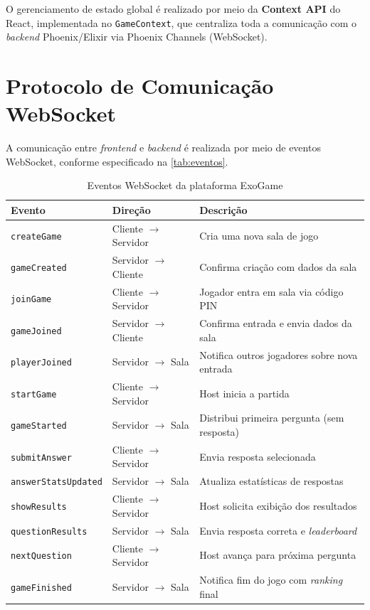 \documentclass[
	12pt,
	openany,
	oneside,
	a4paper,
	english,
	brazil
]{abntex2}
\begin{document}
O gerenciamento de estado global é realizado por meio da \textbf{Context API} do React, implementada no \texttt{GameContext}, que centraliza toda a comunicação com o \textit{backend} Phoenix/Elixir via Phoenix Channels (WebSocket).

\section{Protocolo de Comunicação WebSocket}

A comunicação entre \textit{frontend} e \textit{backend} é realizada por meio de eventos WebSocket, conforme especificado na \autoref{tab:eventos}.

\begin{table}[htb]
\caption{\label{tab:eventos}Eventos WebSocket da plataforma ExoGame}
\begin{tabular}{p{3.5cm}|p{2.5cm}|p{7.5cm}}
  \toprule
  \textbf{Evento} & \textbf{Direção} & \textbf{Descrição} \\
  \midrule
  \texttt{createGame} & Cliente $\rightarrow$ Servidor & Cria uma nova sala de jogo \\
  \midrule
  \texttt{gameCreated} & Servidor $\rightarrow$ Cliente & Confirma criação com dados da sala \\
  \midrule
  \texttt{joinGame} & Cliente $\rightarrow$ Servidor & Jogador entra em sala via código PIN \\
  \midrule
  \texttt{gameJoined} & Servidor $\rightarrow$ Cliente & Confirma entrada e envia dados da sala \\
  \midrule
  \texttt{playerJoined} & Servidor $\rightarrow$ Sala & Notifica outros jogadores sobre nova entrada \\
  \midrule
  \texttt{startGame} & Cliente $\rightarrow$ Servidor & Host inicia a partida \\
  \midrule
  \texttt{gameStarted} & Servidor $\rightarrow$ Sala & Distribui primeira pergunta (sem resposta) \\
  \midrule
  \texttt{submitAnswer} & Cliente $\rightarrow$ Servidor & Envia resposta selecionada \\
  \midrule
  \texttt{answerStatsUpdated} & Servidor $\rightarrow$ Sala & Atualiza estatísticas de respostas \\
  \midrule
  \texttt{showResults} & Cliente $\rightarrow$ Servidor & Host solicita exibição dos resultados \\
  \midrule
  \texttt{questionResults} & Servidor $\rightarrow$ Sala & Envia resposta correta e \textit{leaderboard} \\
  \midrule
  \texttt{nextQuestion} & Cliente $\rightarrow$ Servidor & Host avança para próxima pergunta \\
  \midrule
  \texttt{gameFinished} & Servidor $\rightarrow$ Sala & Notifica fim do jogo com \textit{ranking} final \\
  \bottomrule
\end{tabular}
\end{table}
\end{document}
